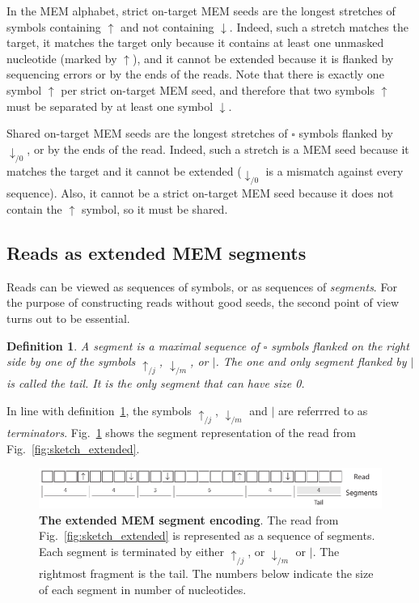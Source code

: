 \documentclass{article}
\newtheorem{definition}{Definition}
\begin{document}
In the MEM alphabet, strict on-target MEM seeds are the longest stretches
of symbols containing $\uparrow$ and not containing $\downarrow$. Indeed,
such a stretch matches the target, it matches the target only because it
contains at least one unmasked nucleotide (marked by $\uparrow$), and it
cannot be extended because it is flanked by sequencing errors or by the
ends of the reads. Note that there is exactly one symbol $\uparrow$ per
strict on-target MEM seed, and therefore that two symbols $\uparrow$ must
be separated by at least one symbol $\downarrow$.

Shared on-target MEM seeds are the longest stretches of $\square$ symbols
flanked by $\downarrow_{/0}$, or by the ends of the read. Indeed, such a
stretch is a MEM seed because it matches the target and it cannot be
extended ($\downarrow_{/0}$ is a mismatch against every sequence). Also,
it cannot be a strict on-target MEM seed because it does not contain the
$\uparrow$ symbol, so it must be shared.

\subsection{Reads as extended MEM segments}

Reads can be viewed as sequences of symbols, or as sequences of
\emph{segments}. For the purpose of constructing reads without good seeds,
the second point of view turns out to be essential.

\begin{definition}
\label{def:segment}
A segment is a maximal sequence of $\square$ symbols flanked on the right
side by one of the symbols $\uparrow_{/j}$, $\downarrow_{/m}$, or $|$. The
one and only segment flanked by $|$ is called the tail. It is the only
segment that can have size 0.
\end{definition}

In line with definition~\ref{def:segment}, the symbols $\uparrow_{/j}$,
$\downarrow_{/m}$ and $|$ are referrred to as \emph{terminators}.
Fig.~\ref{fig:sketch_segment} shows the segment representation of the read
from Fig.~\ref{fig:sketch_extended}.

\begin{figure}[h]
\centering
\includegraphics[scale=.85]{sketch_segments.pdf}
\caption{\textbf{The extended MEM segment encoding}.
The read from Fig.~\ref{fig:sketch_extended} is represented as a sequence
of segments. Each segment is terminated by either $\uparrow_{/j}$, or
$\downarrow_{/m}$ or $|$. The rightmost fragment is the tail. The numbers
below indicate the size of each segment in number of nucleotides.}
\label{fig:sketch_segment}
\end{figure}
\end{document}
